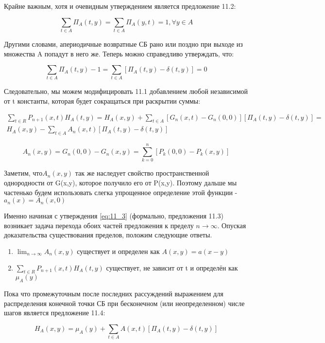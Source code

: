 Крайне важным, хотя и очевидным утверждением является предложение 11.2:

\begin{equation}
 \sum_{t \in A} \Pi_A(t,y) = \sum_{t \in A} \Pi_A(y,t) = 1, \forall y \in A 
\end{equation}

Другими словами, апериодичные возвратные СБ рано или поздно при выходе из множества A попадут в него же. Теперь можно справедливо утверждать, что:

\[ \sum_{t \in A} \Pi_A(t,y) - 1 = \sum_{t \in A} [\Pi_A(t,y) - \delta(t,y)] = 0 \]

Следовательно, мы можем модифицировать 11.1 добавлением любой независимой от t константы, которая будет сокращаться при раскрытии суммы:

\begin{multline}
 \sum_{t \in R} P_{n+1}(x,t)H_A(t,y) = H_A(x,y) + \sum_{t \in A} [G_n(x,t) - G_n(0,0)][\Pi_A(t,y)-\delta(t,y)] = \\
	H_A(x,y) - \sum_{t \in A} A_n(x,t)[\Pi_A(t,y)-\delta(t,y)] 
\label{eq:11_3}
\end{multline}

\[ A_n(x,y) = G_n(0,0) - G_n(x,y) = \sum_{k=0}^{n} [P_k(0,0) - P_k(x,y)]\]

Заметим, что$A_n(x,y)$ так же наследует свойство пространственной однородности от G(x,y), которое получило его от P(x,y). Поэтому дальше мы частенько будем использовать слегка упрощенное определение этой функции - $a_n(x) = A_n(x,0)$

Именно начиная с утверждения \ref{eq:11_3} (формально, предложения 11.3) возникает задача перехода обоих частей предложения к пределу $n \to \infty$. Опуская доказательства существования пределов, положим следующие ответы.

\begin{enumerate}
\item $\lim_{n \to \infty} A_n(x,y)$ существует и определен как $A(x,y) = a(x-y)$ 
\item $\sum_{t \in R} P_{n+1}(x,t)H_A(t,y)$ существует, не зависит от t и определён как $\mu_A(y)$ 
\end{enumerate}

Пока что промежуточным после последних рассуждений выражением для распределения конечной точки СБ при бесконечном (или неопределенном) числе шагов является предложение 11.4:

\begin{equation}
 H_A(x,y) = \mu_A(y) + \sum_{t \in A} A(x,t)[\Pi_A(t,y)-\delta(t,y)]
 \label{eq:H_a_xy}
\end{equation}

